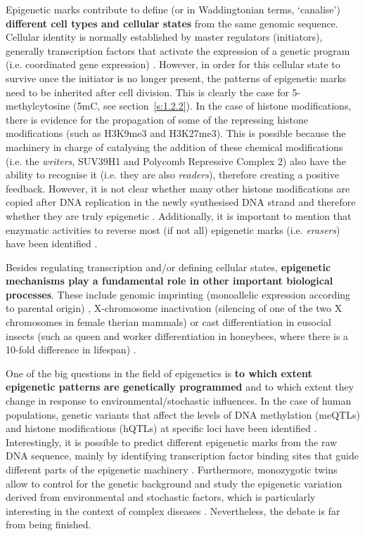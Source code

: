 Epigenetic marks contribute to define (or in Waddingtonian terms, `canalise') \textbf{different cell types and cellular states} from the same genomic sequence. Cellular identity is normally established by master regulators (initiators), generally transcription factors that activate the expression of a genetic program (i.e. coordinated gene expression) \cite{Reinberg2018}. However, in order for this cellular state to survive once the initiator is no longer present, the patterns of epigenetic marks need to be inherited after cell division. This is clearly the case for 5-methylcytosine (\acrshort{5mC}, see section~\ref{s:1.2.2}). In the case of histone modifications, there is evidence for the propagation of some of the repressing histone modifications (such as H3K9me3 and H3K27me3). This is possible because the machinery in charge of catalysing the addition of these chemical modifications (i.e. the \textit{writers}, SUV39H1 and Polycomb Repressive Complex 2) also have the ability to recognise it (i.e. they are also \textit{readers}), therefore creating a positive feedback. However, it is not clear whether many other histone modifications are copied after DNA replication in the newly synthesised DNA strand and therefore whether they are truly epigenetic \cite{Reinberg2018}. Additionally, it is important to mention that enzymatic activities to reverse most (if not all) epigenetic marks (i.e. \textit{erasers}) have been identified \cite{Allis2016}.

\bigskip

Besides regulating transcription and/or defining cellular states, \textbf{epigenetic mechanisms play a fundamental role in other important biological processes}. These include genomic imprinting (monoallelic expression according to parental origin) \cite{Peters2014}, X-chromosome inactivation (silencing of one of the two X chromosomes in female therian mammals) \cite{Wutz2011} or cast differentiation in eusocial insects (such as queen and worker differentiation in honeybees, where there is a 10-fold difference in lifespan) \cite{Patalano2012,Remolina2008}.

\bigskip

One of the big questions in the field of epigenetics is \textbf{to which extent epigenetic patterns are genetically programmed} and to which extent they change in response to environmental/stochastic influences. In the case of human populations, genetic variants that affect the levels of DNA methylation (\acrshort{meQTLs}) and histone modifications (\acrshort{hQTLs}) at specific loci have been identified \cite{Taudt2016}. Interestingly, it is possible to predict different epigenetic marks from the raw DNA sequence, mainly by identifying transcription factor binding sites that guide different parts of the epigenetic machinery \cite{Whitaker2014}. Furthermore, monozygotic twins allow to control for the genetic background and study the epigenetic variation derived from environmental and stochastic factors, which is particularly interesting in the context of complex diseases \cite{Castillo-Fernandez2014}. Nevertheless, the debate is far from being finished.

